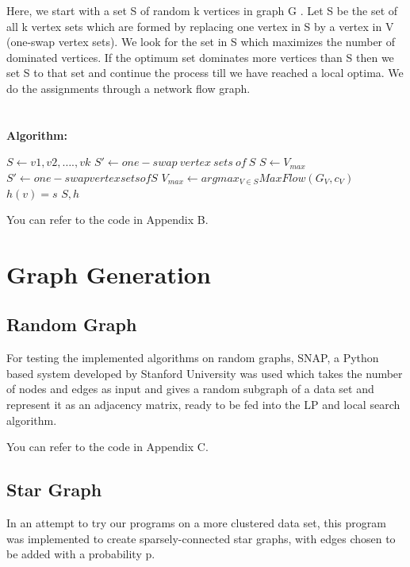 \documentclass[12pt,a4paper,onecolumn]{article}
\begin{document}
Here, we start with a set S of random k vertices in graph G . Let S be the set of all k vertex sets which are formed by replacing one vertex in S by a vertex in V (one-swap vertex sets). We look for the set in S which maximizes the number of dominated vertices. If the optimum set dominates more vertices than S then we set S to that set and continue the process till we have reached a local optima. We do the assignments through a network flow graph.\\\\\\
\textbf{Algorithm:}
\begin{algorithmic}[1]
\STATE $S \leftarrow {v1, v2,…., vk}$
\STATE $S' \leftarrow {one-swap\: vertex\: sets\: of\: S}$
\STATE $S \leftarrow V_{max}$
\STATE $S' \leftarrow {one-swap vertex sets of S}$
\STATE $V_{max} \leftarrow argmax _{V \in S} MaxFlow(G_V , c_V )$
\ENDWHILE 
{}
\STATE $h(v) = s$
\ENDIF
\ENDFOR
\RETURN $S, h$
\ENDIF
\end{algorithmic}


You can refer to the code in Appendix B.






\section{Graph Generation}
\subsection{Random Graph}
For testing the implemented algorithms on random graphs, SNAP, a Python based system developed by Stanford University was used which takes the number of nodes and edges as input and gives a random subgraph of a data set and represent it as an adjacency matrix, ready to be fed into the LP and local search algorithm.

You can refer to the code in Appendix C.

\subsection{Star Graph}
In an attempt to try our programs on a more clustered data set, this program was implemented to create sparsely-connected star graphs, with edges chosen to be added with a probability p.
\end{document}
